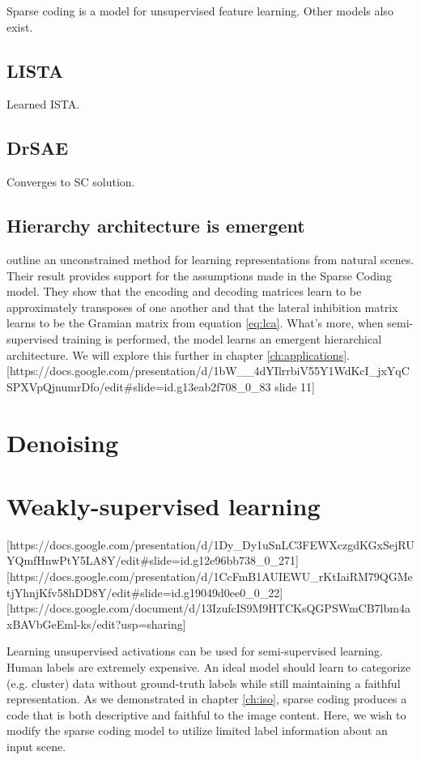 Sparse coding is a model for unsupervised feature learning. Other models also exist.

\subsection{LISTA}
Learned ISTA.

\subsection{DrSAE}
Converges to SC solution.

\subsection{Hierarchy architecture is emergent}
\citet{rolfe2013discriminative} outline an unconstrained method for learning representations from natural scenes. Their result provides support for the assumptions made in the Sparse Coding model. They show that the encoding and decoding matrices learn to be approximately transposes of one another and that the lateral inhibition matrix learns to be the Gramian matrix from equation \ref{eq:lca}. What's more, when semi-supervised training is performed, the model learns an emergent hierarchical architecture. We will explore this further in chapter \ref{ch:applications}.
[https://docs.google.com/presentation/d/1bW__4dYIlrrbiV55Y1WdKcI_jxYqCSPXVpQjnumrDfo/edit#slide=id.g13eab2f708_0_83 slide 11]

\section{Denoising}

\section{Weakly-supervised learning}

[https://docs.google.com/presentation/d/1Dy_Dy1uSnLC3FEWXczgdKGxSejRUYQmfHnwPtY5LA8Y/edit#slide=id.g12e96bb738_0_271]
[https://docs.google.com/presentation/d/1CcFmB1AUIEWU_rKtIaiRM79QGMetjYhnjKfv58hDD8Y/edit#slide=id.g19049d0ee0_0_22]
[https://docs.google.com/document/d/13IzufcIS9M9HTCKsQGPSWmCB7lbm4axBAVbGeEml-ks/edit?usp=sharing]

Learning unsupervised activations can be used for semi-supervised learning. Human labels are extremely expensive. An ideal model should learn to categorize (e.g. cluster) data without ground-truth labels while still maintaining a faithful representation. As we demonstrated in chapter \ref{ch:iso}, sparse coding produces a code that is both descriptive and faithful to the image content. Here, we wish to modify the sparse coding model to utilize limited label information about an input scene.

